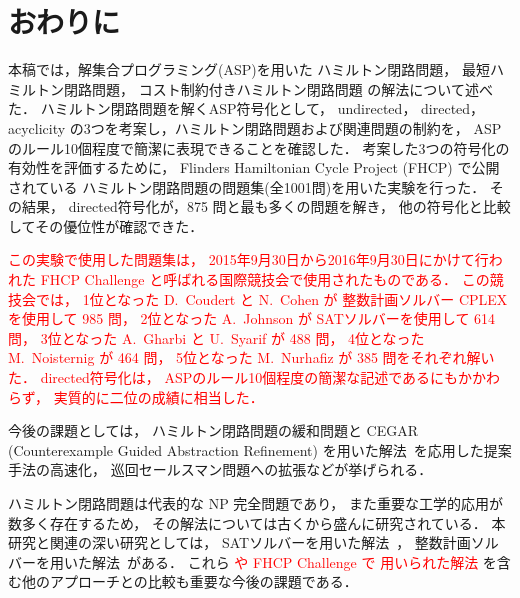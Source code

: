 ﻿%
\section{おわりに}\label{chap:conclusion}

本稿では，解集合プログラミング(ASP)を用いた
ハミルトン閉路問題，
最短ハミルトン閉路問題，
コスト制約付きハミルトン閉路問題
の解法について述べた．
%
ハミルトン閉路問題を解くASP符号化として，
\textsf{undirected}，
\textsf{directed}，
\textsf{acyclicity}
の3つを考案し，ハミルトン閉路問題および関連問題の制約を，
ASPのルール10個程度で簡潔に表現できることを確認した．
%
考案した3つの符号化の有効性を評価するために，
Flinders Hamiltonian Cycle Project (FHCP) で公開されている
ハミルトン閉路問題の問題集(全1001問)を用いた実験を行った．
その結果，
\textsf{directed}符号化が，875 問と最も多くの問題を解き，
他の符号化と比較してその優位性が確認できた．

\textcolor{red}{
  この実験で使用した問題集は，
  2015年9月30日から2016年9月30日にかけて行われた 
  FHCP Challenge と呼ばれる国際競技会で使用されたものである．
  この競技会では，
  1位となった D.~Coudert と N.~Cohen が
  整数計画ソルバー CPLEX を使用して 985 問\cite{cohen17:1001graph}，
  2位となった A.~Johnson が 
  SATソルバーを使用して 614 問\cite{andrew18:triple}，
  3位となった A.~Gharbi と U.~Syarif が 488 問，
  4位となった M.~Noisternig が 464 問，
  5位となった M.~Nurhafiz が 385 問をそれぞれ解いた\cite{haythorpe19:fhcp}．
  \textsf{directed}符号化は，
  ASPのルール10個程度の簡潔な記述であるにもかかわらず，
  実質的に二位の成績に相当した．
}

今後の課題としては，
ハミルトン閉路問題の緩和問題と
CEGAR (Counterexample Guided Abstraction Refinement)
を用いた解法~\cite{soh14:jelia2014,soh20:cegar}を応用した提案手法の高速化，
巡回セールスマン問題への拡張などが挙げられる．

ハミルトン閉路問題は代表的な NP 完全問題であり，
また重要な工学的応用が数多く存在するため，
その解法については古くから盛んに研究されている．
本研究と関連の深い研究としては，
SATソルバーを用いた解法~\cite{Prestwich03:DAM,VelevG09:relative,soh14:jelia2014}，
整数計画ソルバーを用いた解法~\cite{numata11:tsp}がある．
これら
\textcolor{red}{
  や FHCP Challenge で 用いられた解法\cite{cohen17:1001graph,andrew18:triple}
}を含む他のアプローチとの比較も重要な今後の課題である．


